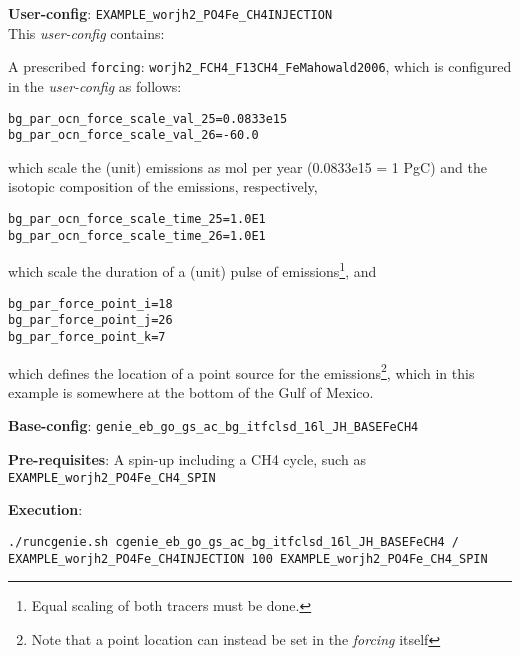 \documentclass[10pt,twoside]{article}
\begin{document}
\noindent \textbf{User-config}: \texttt{EXAMPLE\_worjh2\_PO4Fe\_CH4INJECTION}
\\ This \textit{user-config} contains:
\begin{compactitem}
	\item A prescribed \texttt{forcing}: \texttt{worjh2\_FCH4\_F13CH4\_FeMahowald2006}, which is configured in the \textit{user-config} as follows:
\begin{compactenum}
	\item 
	\begin{verbatim}
bg_par_ocn_force_scale_val_25=0.0833e15
bg_par_ocn_force_scale_val_26=-60.0
		\end{verbatim}
		which scale the (unit) emissions as mol per year (0.0833e15 = 1 PgC) and the isotopic composition of the emissions, respectively,
	\item 
	\begin{verbatim}
bg_par_ocn_force_scale_time_25=1.0E1
bg_par_ocn_force_scale_time_26=1.0E1
		\end{verbatim}
		which scale the duration of a (unit) pulse of emissions\footnote{Equal scaling of both tracers must be done.}, and
	\item 
	\begin{verbatim}
bg_par_force_point_i=18
bg_par_force_point_j=26
bg_par_force_point_k=7
		\end{verbatim}
		which defines the location of a point source for the emissions\footnote{Note that a point location can instead be set in the \textit{forcing} itself}, which in this example is somewhere at the bottom of the Gulf of Mexico.
\end{compactenum}
\end{compactitem}

\noindent \textbf{Base-config}: \texttt{genie\_eb\_go\_gs\_ac\_bg\_itfclsd\_16l\_JH\_BASEFeCH4}

\noindent \textbf{Pre-requisites}: A spin-up including a CH4 cycle, such as \texttt{EXAMPLE\_worjh2\_PO4Fe\_CH4\_SPIN}

\noindent \textbf{Execution}:
\vspace{-10pt}\begin{verbatim}
./runcgenie.sh cgenie_eb_go_gs_ac_bg_itfclsd_16l_JH_BASEFeCH4 / 
EXAMPLE_worjh2_PO4Fe_CH4INJECTION 100 EXAMPLE_worjh2_PO4Fe_CH4_SPIN
		\end{verbatim}
\end{document}
